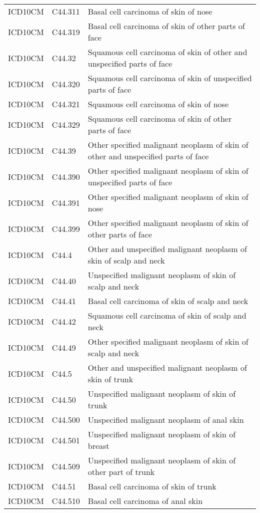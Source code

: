 \begin{longtable}{p{}p{}p{}}
  ICD10CM & C44.311 & Basal cell carcinoma of skin of nose \\ 
  ICD10CM & C44.319 & Basal cell carcinoma of skin of other parts of face \\ 
  ICD10CM & C44.32 & Squamous cell carcinoma of skin of other and unspecified parts of face \\ 
  ICD10CM & C44.320 & Squamous cell carcinoma of skin of unspecified parts of face \\ 
  ICD10CM & C44.321 & Squamous cell carcinoma of skin of nose \\ 
  ICD10CM & C44.329 & Squamous cell carcinoma of skin of other parts of face \\ 
  ICD10CM & C44.39 & Other specified malignant neoplasm of skin of other and unspecified parts of face \\ 
  ICD10CM & C44.390 & Other specified malignant neoplasm of skin of unspecified parts of face \\ 
  ICD10CM & C44.391 & Other specified malignant neoplasm of skin of nose \\ 
  ICD10CM & C44.399 & Other specified malignant neoplasm of skin of other parts of face \\ 
  ICD10CM & C44.4 & Other and unspecified malignant neoplasm of skin of scalp and neck \\ 
  ICD10CM & C44.40 & Unspecified malignant neoplasm of skin of scalp and neck \\ 
  ICD10CM & C44.41 & Basal cell carcinoma of skin of scalp and neck \\ 
  ICD10CM & C44.42 & Squamous cell carcinoma of skin of scalp and neck \\ 
  ICD10CM & C44.49 & Other specified malignant neoplasm of skin of scalp and neck \\ 
  ICD10CM & C44.5 & Other and unspecified malignant neoplasm of skin of trunk \\ 
  ICD10CM & C44.50 & Unspecified malignant neoplasm of skin of trunk \\ 
  ICD10CM & C44.500 & Unspecified malignant neoplasm of anal skin \\ 
  ICD10CM & C44.501 & Unspecified malignant neoplasm of skin of breast \\ 
  ICD10CM & C44.509 & Unspecified malignant neoplasm of skin of other part of trunk \\ 
  ICD10CM & C44.51 & Basal cell carcinoma of skin of trunk \\ 
  ICD10CM & C44.510 & Basal cell carcinoma of anal skin \\ 

\end{longtable}
